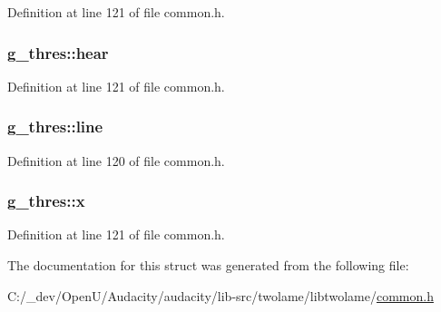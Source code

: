 Definition at line 121 of file common.\+h.

\subsubsection[{\texorpdfstring{hear}{hear}}]{ g\+\_\+thres\+::hear}\hypertarget{structg__thres_a159fe6f7ab328b2b37c129c1a0762ecf}{}\label{structg__thres_a159fe6f7ab328b2b37c129c1a0762ecf}


Definition at line 121 of file common.\+h.

\subsubsection[{\texorpdfstring{line}{line}}]{ g\+\_\+thres\+::line}\hypertarget{structg__thres_a83b4b3155ab893f1d3bce92cc9b7d635}{}\label{structg__thres_a83b4b3155ab893f1d3bce92cc9b7d635}


Definition at line 120 of file common.\+h.

\subsubsection[{\texorpdfstring{x}{x}}]{ g\+\_\+thres\+::x}\hypertarget{structg__thres_a19304eecad54259980b86a18ea398cfb}{}\label{structg__thres_a19304eecad54259980b86a18ea398cfb}


Definition at line 121 of file common.\+h.



The documentation for this struct was generated from the following file\+:\begin{DoxyCompactItemize}
\item 
C\+:/\+\_\+dev/\+Open\+U/\+Audacity/audacity/lib-\/src/twolame/libtwolame/\hyperlink{twolame_2libtwolame_2common_8h}{common.\+h}\end{DoxyCompactItemize}
